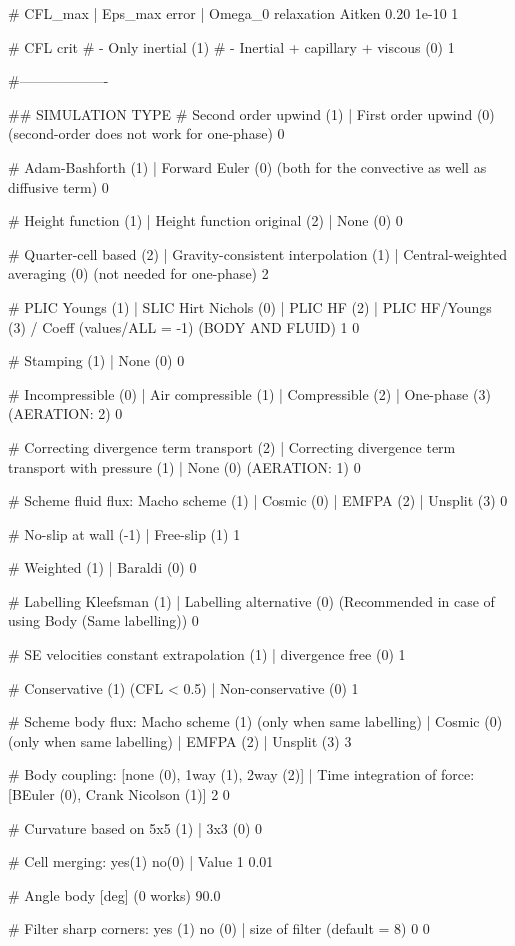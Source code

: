 # CFL_max | Eps_max error | Omega_0 relaxation Aitken
0.20		1e-10	        1

# CFL crit
# - Only inertial (1)
# - Inertial + capillary + viscous (0)
1

#-------------------

## SIMULATION TYPE
# Second order upwind (1)	| First order upwind (0) (second-order does not work for one-phase)
0

# Adam-Bashforth (1)	| Forward Euler (0) (both for the convective as well as diffusive term)
0

# Height function (1)	| Height function original (2) | None (0)
0

# Quarter-cell based (2) | Gravity-consistent interpolation (1)	|	Central-weighted averaging (0) (not needed for one-phase)
2

# PLIC Youngs (1)	| SLIC Hirt Nichols (0) | PLIC HF (2) | PLIC HF/Youngs (3) / Coeff (values/ALL = -1) (BODY AND FLUID)
1 0

# Stamping (1)	| None (0)
0

# Incompressible (0)	| Air compressible (1)	| Compressible (2) | One-phase (3) (AERATION: 2)
0

# Correcting divergence term transport (2) | Correcting divergence term transport with pressure (1) | None (0) (AERATION: 1)
0

# Scheme fluid flux: Macho scheme (1)	|  Cosmic (0) | EMFPA (2) | Unsplit (3)
0

# No-slip at wall (-1)	| Free-slip (1)
1

# Weighted (1) | Baraldi (0)
0

# Labelling Kleefsman (1) | Labelling alternative (0) (Recommended in case of using Body (Same labelling))
0

# SE velocities constant extrapolation (1) | divergence free (0)
1

# Conservative (1) (CFL < 0.5) | Non-conservative (0)
1

# Scheme body flux: Macho scheme (1) (only when same labelling) | Cosmic (0) (only when same labelling) | EMFPA (2) | Unsplit (3)
3

# Body coupling: [none (0), 1way (1), 2way (2)] | Time integration of force: [BEuler (0), Crank Nicolson (1)]
2 0

# Curvature based on 5x5 (1) | 3x3 (0)
0

# Cell merging: yes(1) no(0) | Value
1 0.01
 
# Angle body [deg] (0 works)
90.0

# Filter sharp corners: yes (1) no (0) | size of filter (default = 8)
0 0

